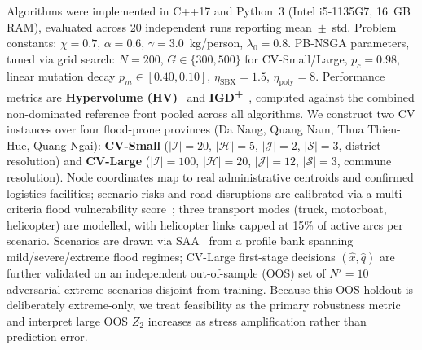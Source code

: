 \documentclass{llncs}
\begin{document}
Algorithms were implemented in C++17 and Python~3 (Intel i5-1135G7, 16~GB RAM), evaluated across 20 independent runs reporting mean~$\pm$~std. Problem constants: $\chi=0.7$, $\alpha=0.6$, $\gamma=3.0$~kg/person, $\lambda_0=0.8$. PB-NSGA parameters, tuned via grid search: $N=200$, $G\in\{300,500\}$ for CV-Small/Large, $p_c=0.98$, linear mutation decay $p_m\in[0.40,0.10]$, $\eta_{\mathrm{SBX}}=1.5$, $\eta_{\mathrm{poly}}=8$. Performance metrics are \textbf{Hypervolume (HV)}~\cite{zitzler1999multiobjective} and \textbf{IGD\textsuperscript{+}}~\cite{ishibuchi2015modified}, computed against the combined non-dominated reference front pooled across all algorithms.
We construct two CV instances over four flood-prone provinces (Da Nang, Quang Nam, Thua Thien-Hue, Quang Ngai): \textbf{CV-Small} ($|\mathcal{I}|=20$, $|\mathcal{H}|=5$, $|\mathcal{J}|=2$, $|\mathcal{S}|=3$, district resolution) and \textbf{CV-Large} ($|\mathcal{I}|=100$, $|\mathcal{H}|=20$, $|\mathcal{J}|=12$, $|\mathcal{S}|=3$, commune resolution). Node coordinates map to real administrative centroids and confirmed logistics facilities; scenario risks and road disruptions are calibrated via a multi-criteria flood vulnerability score~\cite{nguyen2021flood}; three transport modes (truck, motorboat, helicopter) are modelled, with helicopter links capped at 15\% of active arcs per scenario. Scenarios are drawn via SAA~\cite{shapiro2003monte} from a profile bank spanning mild/severe/extreme flood regimes; CV-Large first-stage decisions $(\hat{x},\hat{q})$ are further validated on an independent out-of-sample (OOS) set of $N'=10$ adversarial extreme scenarios disjoint from training. Because this OOS holdout is deliberately extreme-only, we treat feasibility as the primary robustness metric and interpret large OOS $Z_2$ increases as stress amplification rather than prediction error.
\end{document}
